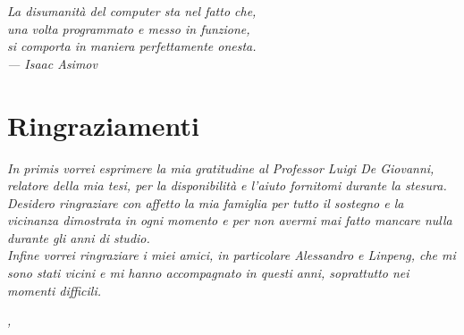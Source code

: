 
\cleardoublepage
{}
{}

\begin{flushright}
	{
	\slshape
	La disumanità del computer sta nel fatto che,\\
	una volta programmato e messo in funzione,\\
	si comporta in maniera perfettamente onesta. \\
	\medskip
	--- Isaac Asimov
	}
	\end{flushright}
	
	\bigskip
	
	\begingroup
	\let\clearpage\relax
	\let\cleardoublepage\relax
	\let\cleardoublepage\relax
	
	\chapter*{Ringraziamenti}
	
	\noindent
	\textit{In primis vorrei esprimere la mia gratitudine al
			Professor Luigi De Giovanni, relatore della mia tesi,
			per la disponibilità e l'aiuto fornitomi durante la
			stesura.}\\
	
	\noindent
	\textit{Desidero ringraziare con affetto la mia famiglia
			per tutto il sostegno e la vicinanza dimostrata
			in ogni momento e per non avermi mai fatto mancare
			nulla durante gli anni di studio.}\\
	
	\noindent
	\textit{Infine vorrei ringraziare i miei amici,
			in particolare Alessandro e Linpeng, che mi sono
			stati vicini e mi hanno accompagnato in questi anni,
			soprattutto nei momenti difficili.}\\
	\bigskip
	
	\noindent\textit{\myLocation, \myTime}
	\begin{flushright}
	\myName
	\end{flushright}
	
	\endgroup

